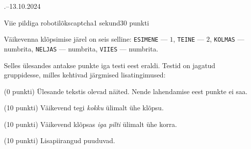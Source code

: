 \documentclass[a4paper,11pt]{article}
\begin{document}
\begin{ol}{\eio}{.--13.10.2024}{\yle}{}
\begin{yl}{2}{Viie pildiga robotilõks}{captcha}{1 sekund}{30 punkti}
    \clearpage
    \nde[1]{3cm}{3cm}

    Väikevenna klõpsimise järel on seis selline: \verb/ESIMENE/ --- $1$, \verb/TEINE/ --- $2$, \verb/KOLMAS/ --- numbrita, \verb/NELJAS/ --- numbrita, \verb/VIIES/ --- numbrita.

    \hnd Selles ülesandes antakse punkte iga testi eest eraldi. Testid on jagatud gruppidesse, milles kehtivad järgmised lisatingimused:
    \begin{xenum}
      \item (0 punkti) Ülesande tekstis olevad näited. Nende lahendamise eest punkte ei saa.
      \item (10 punkti) Väikevend tegi \textit{kokku} ülimalt ühe klõpsu.
      \item (10 punkti) Väikevend klõpsas \textit{iga pilti} ülimalt ühe korra.
      \item (10 punkti) Lisapiirangud puuduvad.
    \end{xenum}
  \end{yl}
\end{ol}
\end{document}
